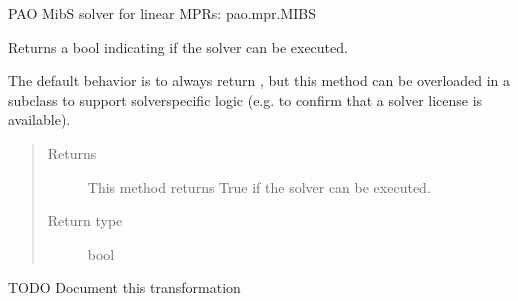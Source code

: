 \documentclass[letterpaper,10pt,english]{sphinxmanual}
\begin{document}
\begin{fulllineitems}
\label{\detokenize{reference/mpr:pao.mpr.solvers.mibs.LinearMultilevelSolver_MIBS}}
PAO MibS solver for linear MPRs: pao.mpr.MIBS

\begin{fulllineitems}
\label{\detokenize{reference/mpr:pao.mpr.solvers.mibs.LinearMultilevelSolver_MIBS.available}}
Returns a bool indicating if the solver can be executed.

The default behavior is to always return , but this method
can be overloaded in a subclass to support solver\sphinxhyphen{}specific logic
(e.g.  to confirm that a solver license is available).
\begin{quote}\begin{description}
\item[{Returns}] \leavevmode
This method returns True if the solver can be executed.

\item[{Return type}] \leavevmode
bool

\end{description}\end{quote}

\end{fulllineitems}


\begin{fulllineitems}
\label{\detokenize{reference/mpr:pao.mpr.solvers.mibs.LinearMultilevelSolver_MIBS.create_mibs_model}}
TODO \sphinxhyphen{} Document this transformation

\end{fulllineitems}



\end{fulllineitems}
\end{document}
